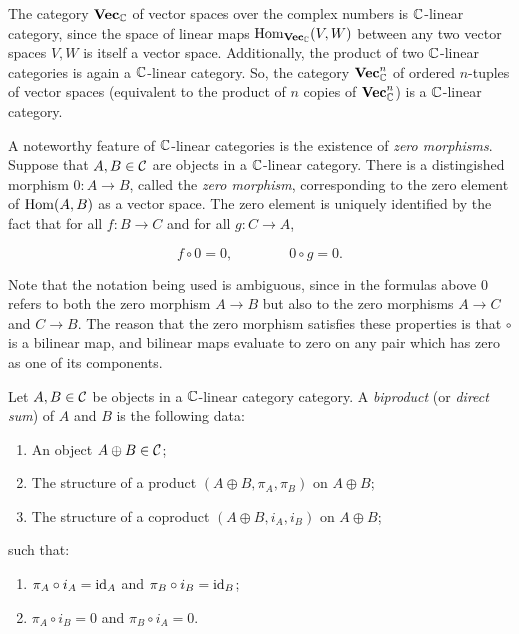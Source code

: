 \begin{ex} The category ${\bf Vec}_{{\mathbb C}}$ of vector spaces over the complex numbers is  ${\mathbb C}$-linear category, since the space of linear maps $\operatorname{Hom}_{{\bf Vec}_{{\mathbb C}}}(V,W)$ between any two vector spaces $V,W$ is itself a vector space. Additionally, the product of two ${\mathbb C}$-linear categories is again a ${\mathbb C}$-linear category. So, the category ${\bf Vec}_{{\mathbb C}}^n$ of ordered $n$-tuples of vector spaces (equivalent to the product of $n$ copies of ${\bf Vec}_{{\mathbb C}}^n$) is a ${\mathbb C}$-linear category.
\end{ex}

\begin{rem} A noteworthy feature of ${\mathbb C}$-linear categories is the existence of {\em zero morphisms}. Suppose that $A,B\in {\mathcal C}$ are objects in a ${\mathbb C}$-linear category. There is a distingished morphism $0:A\to B$, called the {\em zero morphism}, corresponding to the zero element of $\operatorname{Hom}(A,B)$ as a vector space. The zero element is uniquely identified by the fact that for all $f:B\to C$ and for all $g:C\to A$,

$$ f\circ 0=0, \qquad\qquad 0\circ g=0.$$

Note that the notation being used is ambiguous, since in the formulas above $0$ refers to both the zero morphism $A\to B$ but also to the zero morphisms $A\to C$ and $C\to B$. The reason that the zero morphism satisfies these properties is that $\circ$ is a bilinear map, and bilinear maps evaluate to zero on any pair which has zero as one of its components.
\end{rem}

\begin{defn}[Biproduct]\label{biproduct-definition} Let $A,B\in {\mathcal C}$ be objects in a ${\mathbb C}$-linear category category. A {\em biproduct} (or {\em direct sum}) of $A$ and $B$ is the following data:

\begin{enumerate}
\item An object $A\oplus B\in {\mathcal C}$;
\item The structure of a product $(A\oplus B,\pi_A,\pi_B)$ on $A\oplus B$;
\item The structure of a coproduct $(A\oplus B,i_A,i_B)$ on $A\oplus B$;
\end{enumerate}

such that:

\begin{enumerate}
\item $\pi_A\circ i_A=\operatorname{id}_A$ and $\pi_B\circ i_B=\operatorname{id}_B$;
\item $\pi_A\circ i_B=0$ and $\pi_B\circ i_A=0$.
\end{enumerate}
\end{defn}

